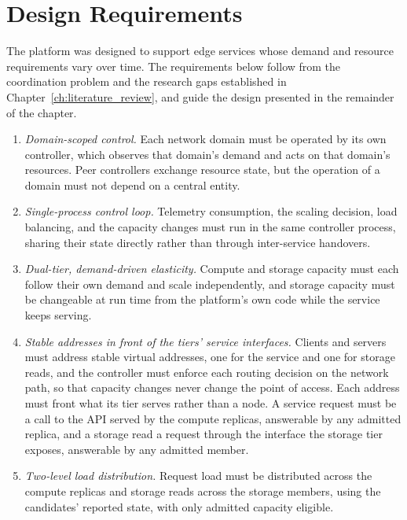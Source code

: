 ﻿\documentclass[12pt,reqno,twoside]{amsbook}
\begin{document}
\section{Design Requirements}\label{sec:design_requirements}
The platform was designed to support edge services whose demand and
resource requirements vary over time. The requirements below follow from the
coordination problem and the research gaps established in
Chapter~\ref{ch:literature_review}, and guide the design
presented in the remainder of the chapter.

\begin{enumerate}[label=\textit{DR\arabic*:}, leftmargin=*]
    \item \textit{Domain-scoped control.} Each network domain must be operated
    by its own controller, which observes that domain's demand and acts on
    that domain's resources. Peer controllers exchange resource state, but the
    operation of a domain must not depend on a central entity.

    \item \textit{Single-process control loop.} Telemetry consumption, the
    scaling decision, load balancing, and the capacity changes must run in
    the same controller process, sharing their state directly rather than
    through inter-service handovers.

    \item \textit{Dual-tier, demand-driven elasticity.} Compute and storage
    capacity must each follow their own demand and scale independently, and
    storage capacity must be changeable at run time from the platform's own
    code while the service keeps serving.

    \item \textit{Stable addresses in front of the tiers' service interfaces.}
    Clients and servers must address stable virtual addresses, one for the
    service and one for storage reads, and the controller must enforce each
    routing decision on the network path, so that capacity changes never
    change the point of access. Each address must front what its tier serves
    rather than a node. A service request must be a call to the API served by
    the compute replicas, answerable by any admitted replica, and a storage
    read a request through the interface the storage tier exposes, answerable
    by any admitted member.

    \item \textit{Two-level load distribution.} Request load must be
    distributed across the compute replicas and storage reads across the
    storage members, using the candidates' reported state, with only admitted
    capacity eligible.


\end{enumerate}
\end{document}

